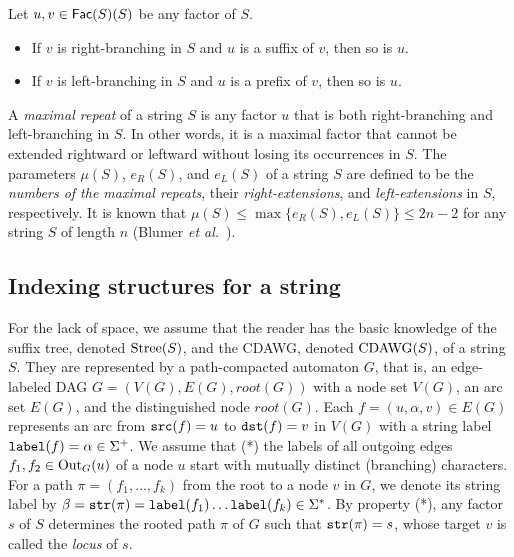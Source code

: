 \begin{lemma}\label{lem:closure:branching}
  Let $u, v \in \mathsf{Fac}{(S)}(S)$ be any factor of $S$.
\begin{itemize}
\item If $v$ is right-branching in $S$ and $u$ is a suffix of $v$, then so is $u$. 
\item If $v$ is left-branching in $S$ and $u$ is a prefix of $v$, then so is $u$. 
\end{itemize}
\end{lemma}

A \textit{maximal repeat} of a string $S$ is any factor $u$ that is both right-branching and left-branching in $S$. In other words, it is a maximal factor that cannot be extended rightward or leftward without losing its occurrences in $S$. 
The parameters $\mu(S)$, $e_R(S)$, and $e_L(S)$ of a string $S$ are defined to be the \textit{numbers of the maximal repeats}, their \textit{right-extensions}, and \textit{left-extensions} in $S$, respectively. It is known that $\mu(S) \le \max\{e_R(S), e_L(S)\} \le 2n - 2$ for any string $S$ of length $n$ (Blumer \textit{et al.}~\cite{blumer1987complete}).




\subsection{Indexing structures for a string}
For the lack of space, we assume that the reader has the basic knowledge of the suffix tree, denoted $\mathrm{Stree}(S)$, and the CDAWG, denoted $\mathrm{CDAWG}(S)$, of a string $S$. 
They are represented by a path-compacted automaton $G$, that is, an edge-labeled DAG $G = (V(G), E(G), root(G))$ with a node set $V(G)$, an arc set $E(G)$, and the distinguished node $root(G)$. 
Each $f = (u, \alpha, v) \in E(G)$ represents an arc from $\mathtt{src}(f)=u$ to $\mathtt{dst}(f)=v$ in $V(G)$ with a string label $\mathtt{label}(f)=\alpha \in \Sigma^+$. 
We assume 
that (*) the labels of all outgoing edges $f_1, f_2 \in \mathrm{Out}_{G}(u)$ of a node $u$ start with mutually distinct (branching) characters. 
For a path $\pi = (f_1, \dots, f_k)$ from the root to a node $v$ in $G$, we denote its string label by $\beta = \mathtt{str}(\pi) = \mathtt{label}(f_1)\dots \mathtt{label}(f_k) \in \Sigma^*$. 
By property (*), 
any factor $s$ of $S$ determines the rooted path $\pi$ of $G$ such that $\mathtt{str}(\pi) = s$, whose target $v$ is called the \textit{locus} of $s$. 

